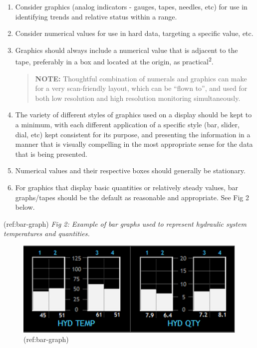 \documentclass[
]{book}
\begin{document}
\begin{enumerate}
\begin{enumerate}
    \begin{enumerate}
    \def\labelenumiii{\arabic{enumiii}.}
    \item
      Consider graphics (analog indicators - gauges, tapes, needles, etc) for use in identifying trends and relative status within a range.
    \item
      Consider numerical values for use in hard data, targeting a specific value, etc.
    \item
      Graphics should always include a numerical value that is adjacent to the tape, preferably in a box and located at the origin, as practical\textsuperscript{2}.

      \begin{quote}
      \textbf{NOTE:} Thoughtful combination of numerals and graphics can make for a very scan-friendly layout, which can be ``flown to'', and used for both low resolution and high resolution monitoring simultaneously.
      \end{quote}
    \item
      The variety of different styles of graphics used on a display should be kept to a minimum, with each different application of a specific style (bar, slider, dial, etc) kept consistent for its purpose, and presenting the information in a manner that is visually compelling in the most appropriate sense for the data that is being presented.
    \item
      Numerical values and their respective boxes should generally be stationary.
    \item
      For graphics that display basic quantities or relatively steady values, bar graphs/tapes should be the default as reasonable and appropriate. See Fig 2 below.
    \end{enumerate}

    (ref:bar-graph) \emph{Fig 2: Example of bar graphs used to represent hydraulic system temperatures and quantities.}

    \begin{figure}
    \centering
    \includegraphics{media/21/bar-graphs.png}
    \caption{(ref:bar-graph)}
    \end{figure}


\end{enumerate}
\end{enumerate}
\end{document}

